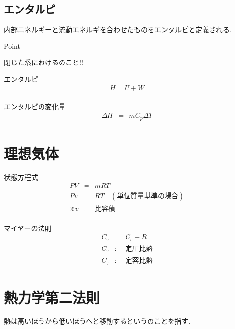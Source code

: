 \documentclass[a4paper]{jsarticle}
\begin{document}
\subsection{エンタルピ}
内部エネルギーと流動エネルギを合わせたものをエンタルピと定義される.
\begin{itembox}[l]{Point}
    \begin{center}
        閉じた系におけるのこと!!
    \end{center}
\end{itembox}
\begin{itembox}[l]{エンタルピ}
    \begin{eqnarray*}
        H=U+W\\
    \end{eqnarray*}
\end{itembox}
\begin{itembox}[l]{エンタルピの変化量}
    \begin{eqnarray*}
        \Delta H&=&mC_p\Delta T\\
    \end{eqnarray*}
\end{itembox}
\section{理想気体}
\begin{itembox}[l]{状態方程式}
    \begin{eqnarray*}
        PV&=&mRT\\
        Pv&=&RT\quad (単位質量基準の場合)\\
        ※v&:&比容積\\
    \end{eqnarray*}
\end{itembox}
\begin{itembox}[l]{マイヤーの法則}
    \begin{eqnarray*}
        C_p&=&C_v+R\\
        C_p&:&定圧比熱\\
        C_v&:&定容比熱\\
    \end{eqnarray*}
\end{itembox}
\section{熱力学第二法則}
\begin{screen}
    \begin{center}
        熱は高いほうから低いほうへと移動するというのことを指す.
    \end{center}
\end{screen}
\end{document}
